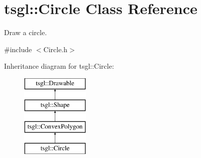 \hypertarget{classtsgl_1_1_circle}{}\section{tsgl\+:\+:Circle Class Reference}
\label{classtsgl_1_1_circle}


Draw a circle.  




{\ttfamily \#include $<$Circle.\+h$>$}

Inheritance diagram for tsgl\+:\+:Circle\+:\begin{figure}[H]
\begin{center}
\leavevmode
\includegraphics[height=4.000000cm]{classtsgl_1_1_circle}
\end{center}
\end{figure}
